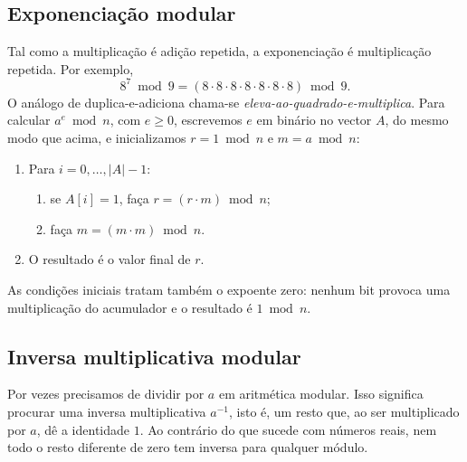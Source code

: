 \subsection{Exponenciação modular}

Tal como a multiplicação é adição repetida, a exponenciação é multiplicação
repetida. Por exemplo,
\[
8^7\bmod 9=(8\cdot8\cdot8\cdot8\cdot8\cdot8\cdot8)\bmod 9.
\]
O análogo de duplica-e-adiciona chama-se {\em eleva-ao-quadrado-e-multiplica}.
Para calcular \(a^e\bmod n\), com \(e\geq0\), escrevemos \(e\) em binário no
vector \(A\), do mesmo modo que acima, e inicializamos
\(r=1\bmod n\) e \(m=a\bmod n\):
\begin{enumerate}
		\item Para \(i=0,\ldots,|A|-1\):
		\begin{enumerate}
			\item se \(A[i]=1\), faça \(r=(r\cdot m)\bmod n\);
			\item faça \(m=(m\cdot m)\bmod n\).
		\end{enumerate}
		\item O resultado é o valor final de \(r\).
\end{enumerate}

As condições iniciais tratam também o expoente zero: nenhum bit provoca uma
multiplicação do acumulador e o resultado é \(1\bmod n\).


\subsection{Inversa multiplicativa modular}

Por vezes precisamos de dividir por \(a\) em aritmética modular. Isso significa
procurar uma inversa multiplicativa \(a^{-1}\), isto é, um resto que, ao ser
multiplicado por \(a\), dê a identidade \(1\). Ao contrário do que sucede com
números reais, nem todo o resto diferente de zero tem inversa para qualquer
módulo.


